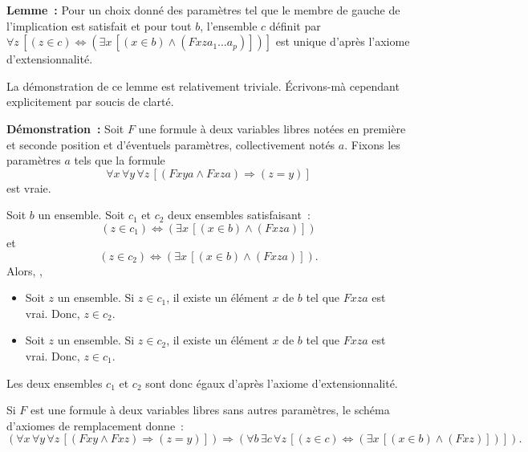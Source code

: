 \noindent\textbf{Lemme :} Pour un choix donné des paramètres tel que le membre de gauche de l'implication est satisfait et pour tout $b$, l'ensemble $c$ définit par $\forall z \, \left[ (z \in c) \Leftrightarrow (\exists x \, [(x \in b) \wedge (F x z a_1 \dots a_p)]) \right]$ est unique d'après l'axiome d'extensionnalité.

\medskip

La démonstration de ce lemme est relativement triviale. 
Écrivons-mà cependant explicitement par soucis de clarté. 

\medskip

\noindent\textbf{Démonstration :} 
    Soit $F$ une formule à deux variables libres notées en première et seconde position et d'éventuels paramètres, collectivement notés $a$. 
    Fixons les paramètres $a$ tels que la formule
    \begin{equation*}
        \forall x \, \forall y \, \forall z \, \left[
            (F x y a \wedge F x z a) \Rightarrow (z = y)
        \right]
    \end{equation*}
    est vraie. 
    
    Soit $b$ un ensemble. 
    Soit $c_1$ et $c_2$ deux ensembles satisfaisant : 
    \begin{equation*}
        (z \in c_1) \Leftrightarrow (\exists x \, [(x \in b) \wedge (F x z a)])
    \end{equation*}
    et 
    \begin{equation*}
        (z \in c_2) \Leftrightarrow (\exists x \, [(x \in b) \wedge (F x z a)]) .
    \end{equation*}
    Alors, ,
    \begin{itemize}[nosep]
        \item Soit $z$ un ensemble. 
            Si $z \in c_1$, il existe un élément $x$ de $b$ tel que $F x z a$ est vrai. 
            Donc, $z \in c_2$.
        \item Soit $z$ un ensemble. 
            Si $z \in c_2$, il existe un élément $x$ de $b$ tel que $F x z a$ est vrai. 
            Donc, $z \in c_1$.
    \end{itemize}
    Les deux ensembles $c_1$ et $c_2$ sont donc égaux d'après l'axiome d'extensionnalité.

   \done 

\medskip

Si $F$ est une formule à deux variables libres sans autres paramètres, le schéma d'axiomes de remplacement donne :
\begin{equation*}
    \left( 
        \forall x \, \forall y \, \forall z \, \left[
            (F x y \wedge F x z) \Rightarrow (z = y)
        \right]
    \right)
    \Rightarrow
    \left(
        \forall b \, \exists c \, \forall z \, \left[
            (z \in c) \Leftrightarrow (\exists x \, [(x \in b) \wedge (F x z)])
        \right]
    \right)
.
\end{equation*}


